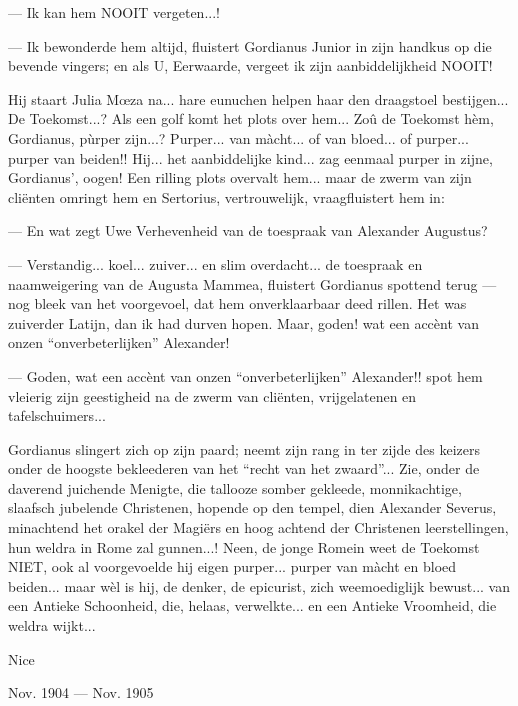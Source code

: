 \documentclass[a4paper, 12pt, oneside, dutch]{article}
\begin{document}
--- Ik kan hem NOOIT vergeten...!

--- Ik bewonderde hem altijd, fluistert Gordianus Junior in zijn handkus op die bevende vingers; en als U, Eerwaarde, vergeet ik zijn aanbiddelijkheid NOOIT!

Hij staart Julia Mœza na... hare eunuchen helpen haar den draagstoel bestijgen... De Toekomst...? Als een golf komt het plots over hem... Zoû de Toekomst hèm, Gordianus, pùrper zijn...? Purper... van màcht... of van bloed... of purper... purper van beiden!! Hij... het aanbiddelijke kind... zag eenmaal purper in zijne, Gordianus', oogen! Een rilling plots overvalt hem... maar de zwerm van zijn cliënten omringt hem en Sertorius, vertrouwelijk, vraagfluistert hem in:

--- En wat zegt Uwe Verhevenheid van de toespraak van Alexander Augustus?

--- Verstandig... koel... zuiver... en slim overdacht... de toespraak en naamweigering van de Augusta Mammea, fluistert Gordianus spottend terug --- nog bleek van het voorgevoel, dat hem onverklaarbaar deed rillen. Het was zuiverder Latijn, dan ik had durven hopen. Maar, goden! wat een accènt van onzen "`onverbeterlijken"' Alexander!

--- Goden, wat een accènt van onzen "`onverbeterlijken"' Alexander!! spot hem vleierig zijn geestigheid na de zwerm van cliënten, vrijgelatenen en tafelschuimers...

Gordianus slingert zich op zijn paard; neemt zijn rang in ter zijde des keizers onder de hoogste bekleederen van het "`recht van het zwaard"'... Zie, onder de daverend juichende Menigte, die tallooze somber gekleede, monnikachtige, slaafsch jubelende Christenen, hopende op den tempel, dien Alexander Severus, minachtend het orakel der Magiërs en hoog achtend der Christenen leerstellingen, hun weldra in Rome zal gunnen...! Neen, de jonge Romein weet de Toekomst NIET, ook al voorgevoelde hij eigen purper... purper van màcht en bloed beiden... maar wèl is hij, de denker, de epicurist, zich weemoediglijk bewust... van een Antieke Schoonheid, die, helaas, verwelkte... en een Antieke Vroomheid, die weldra wijkt...

Nice

Nov. 1904 --- Nov. 1905
\clearpage
\end{document}
